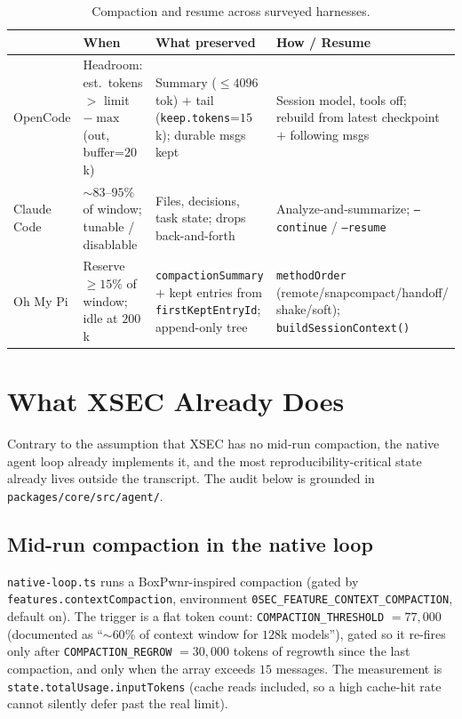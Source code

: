 \documentclass[11pt]{article}
\begin{document}
\begin{table}[t]
\centering
\small
\begin{tabular}{@{}p{2.0cm}p{3.4cm}p{3.4cm}p{3.4cm}@{}}
\toprule
 & \textbf{When} & \textbf{What preserved} & \textbf{How / Resume} \\
\midrule
OpenCode &
Headroom: est.\ tokens $>$ limit $-\max$(out, buffer=$20$k) &
Summary ($\le 4096$ tok) $+$ tail (\texttt{keep.tokens}=$15$k); durable msgs kept &
Session model, tools off; rebuild from latest checkpoint $+$ following msgs \\
\addlinespace
Claude Code &
$\sim 83$--$95\%$ of window; tunable / disablable &
Files, decisions, task state; drops back-and-forth &
Analyze-and-summarize; \texttt{--continue} / \texttt{--resume} \\
\addlinespace
Oh My Pi &
Reserve $\ge 15\%$ of window; idle at $200$k &
\texttt{compactionSummary} $+$ kept entries from \texttt{firstKeptEntryId}; append-only tree &
\texttt{methodOrder} (remote/snapcompact/handoff/ shake/soft); \texttt{buildSessionContext()} \\
\bottomrule
\end{tabular}
\caption{Compaction and resume across surveyed harnesses.}
\label{tab:survey}
\end{table}

\section{What XSEC Already Does}

Contrary to the assumption that XSEC has no mid-run compaction, the native agent
loop already implements it, and the most reproducibility-critical state already
lives outside the transcript. The audit below is grounded in
\texttt{packages/core/src/agent/}.

\subsection{Mid-run compaction in the native loop}

\texttt{native-loop.ts} runs a BoxPwnr-inspired compaction (gated by
\texttt{features.contextCompaction}, environment
\texttt{0SEC\_FEATURE\_CONTEXT\_COMPACTION}, default on). The trigger is a flat
token count: \texttt{COMPACTION\_THRESHOLD} $=77{,}000$ (documented as ``$\sim
60\%$ of context window for $128$k models''), gated so it re-fires only after
\texttt{COMPACTION\_REGROW} $=30{,}000$ tokens of regrowth since the last
compaction, and only when the array exceeds $15$ messages. The measurement is
\texttt{state.totalUsage.inputTokens} (cache reads included, so a high cache-hit
rate cannot silently defer past the real limit).
\end{document}
